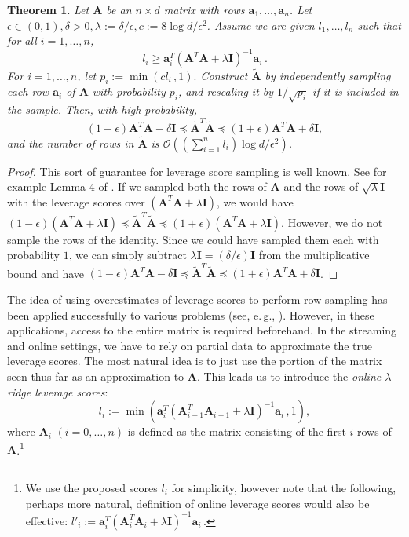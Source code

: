 \documentclass[11pt]{article}
\numberwithin{equation}{section}
\newtheorem{theorem}{Theorem}[section]
\theoremstyle{definition}
\theoremstyle{plain}
\newcommand{\eg}{e.\,g.}
\newcommand{\Oh}{\ensuremath{\mathcal{O}}}
\newcommand{\bv}[1]{\mathbf{#1}}
\begin{document}
\begin{theorem}
    \label{thm:leverage_sampling}
    Let $\bv{A}$ be an $n \times d$ matrix with rows $\bv{a}_1, \ldots, \bv{a}_n$.
    Let $\epsilon \in (0, 1), \delta > 0, \lambda := \delta / \epsilon, c := 8 \log d / \epsilon^2$.
    Assume we are given $l_1, \ldots, l_n$ such that for all $i = 1, \ldots, n$,
    $$
        l_i \geq \bv{a}_i^T (\bv{A}^T \bv{A} + \lambda \bv{I})^{-1} \bv{a}_i\,.
    $$
    For $i = 1, \ldots, n$, let
    $
        p_i := \min(cl_i\,, 1).
    $
    Construct $\bv{\tilde{A}}$ by independently sampling each row $\bv{a}_i$ of $\bv{A}$ with probability $p_i$, and rescaling it by $1 / \sqrt{p_i}$ if it is included in the sample.
    Then, with high probability,
    $$
        (1-\epsilon)\bv{A}^T\bv{A} - \delta\bv{I} \preceq \bv{\tilde{A}}^T\bv{\tilde{A}} \preceq (1+\epsilon)\bv{A}^T\bv{A} + \delta\bv{I},
    $$
    and the number of rows in $\bv{\tilde{A}}$ is $\Oh\left(\left(\sum_{i=1}^n l_i\right) \log d / \epsilon^2\right)$.
\end{theorem}
\begin{proof}
This sort of guarantee for leverage score sampling is well known. See for example Lemma 4 of \cite{cohen2015uniform}. If we sampled both the rows of $\bv{A}$ and the rows of $\sqrt{\lambda} \bv{I}$ with the leverage scores over $(\bv{A}^T\bv{A} + \lambda \bv I)$, we would have $(1-\epsilon)(\bv{A}^T\bv{A} + \lambda \bv I) \preceq \bv{\tilde A}^T \bv{\tilde A} \preceq(1+\epsilon)(\bv{A}^T\bv{A} + \lambda \bv I)$. However, we do not sample the rows of the identity. Since we could have sampled them each with probability $1$, we can simply subtract $\lambda \bv I = (\delta/\epsilon) \bv I$ from the multiplicative bound and have
%
$(1-\epsilon)\bv{A}^T\bv{A} - \delta\bv{I} \preceq \bv{\tilde{A}}^T\bv{\tilde{A}} \preceq (1+\epsilon)\bv{A}^T\bv{A} + \delta\bv{I}$.
\end{proof}

The idea of using overestimates of leverage scores to perform row sampling has been applied successfully to various problems (see, \eg, \cite{koutis2010approaching,cohen2015uniform}).
However, in these applications, access to the entire matrix is required beforehand.
In the streaming and online settings, we have to rely on partial data to approximate the true leverage scores.
The most natural idea is to just use the portion of the matrix seen thus far as an approximation to $\bv{A}$.
This leads us to introduce the \emph{online $\lambda$-ridge leverage scores}:
$$
    l_i := \min(\bv{a}_i^T (\bv{A}_{i-1}^T \bv{A}_{i-1} + \lambda \bv{I})^{-1} \bv{a}_i\,, 1),
$$
where $\bv{A}_i$ $(i = 0,\ldots,n)$ is defined as the matrix consisting of the first $i$ rows of $\bv{A}$.\footnote{We use the proposed scores $l_i$ for simplicity, however note that the following, perhaps more natural, definition of online leverage scores would also be effective: 
$
 l'_i := \bv{a}_i^T (\bv{A}_{i}^T \bv{A}_{i} + \lambda \bv{I})^{-1} \bv{a}_i\,.
$}
\end{document}
